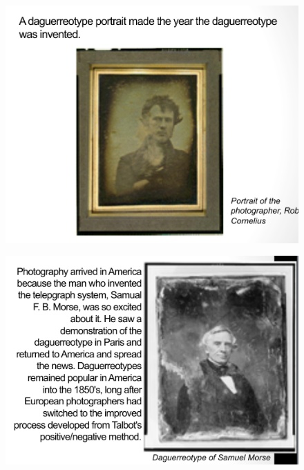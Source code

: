 \documentclass{beamer}
\begin{document}
\begin{frame}
	\begin{figure}
		\centering
		\includegraphics[scale=0.4]{85.jpg}
	\end{figure}
\end{frame}

\begin{frame}
	\begin{figure}
		\centering
		\includegraphics[scale=0.4]{86.jpg}
	\end{figure}
\end{frame}
\end{document}
